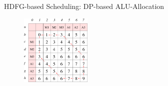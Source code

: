 \documentclass[handout]{beamer}
\begin{document}
\begin{CJK}{UTF8}{bkai}
\begin{frame}{HDFG-based Scheduling: DP-based ALU-Allocation}
\begin{figure}[!ht]
\begin{center}
{                                \includegraphics[width=0.3\textwidth]{figs/alloc3.eps}
                            }
                        \end{center}
                        \label{fig:alloc}
                    \end{figure}
            \end{frame}


\end{CJK}
\end{document}
